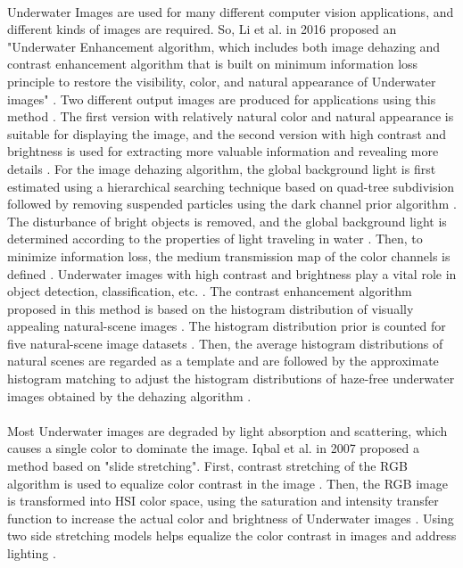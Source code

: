 \documentclass[a4paper,11pt,oneside]{article}
\begin{document}
  \\
   Underwater Images are used for many different computer vision applications, and different kinds of images are required. So, Li et al. in 2016 \cite{21} proposed an "Underwater Enhancement algorithm, which includes both image dehazing and contrast enhancement algorithm that is built on minimum information loss principle to restore the visibility, color, and natural appearance of Underwater images" \cite{21}. Two different output images are produced for applications using this method \cite{21}. The first version with relatively natural color and natural appearance is suitable for displaying the image, and the second version with high contrast and brightness is used for extracting more valuable information and revealing more details \cite{21}. For the image dehazing algorithm, the global background light is first estimated using a hierarchical searching technique based on quad-tree subdivision followed by removing suspended particles using the dark channel prior algorithm \cite{21}. The disturbance of bright objects is removed, and the global background light is determined according to the properties of light traveling in water \cite{21}. Then, to minimize information loss, the medium transmission map of the color channels is defined \cite{21}. Underwater images with high contrast and brightness play a vital role in object detection, classification, etc. \cite{21}. The contrast enhancement algorithm proposed in this method is based on the histogram distribution of visually appealing natural-scene images \cite{21}. The histogram distribution prior is counted for five natural-scene image datasets \cite{21}. Then, the average histogram distributions of natural scenes are regarded as a template and are followed by the approximate histogram matching to adjust the histogram distributions of haze-free underwater images obtained by the dehazing algorithm \cite{21}.\\
  \\
  Most Underwater images are degraded by light absorption and scattering, which causes a single color to dominate the image. Iqbal et al. in 2007 \cite{4} proposed a method based on "slide stretching". First, contrast stretching of the RGB algorithm is used to equalize color contrast in the image \cite{4}. Then, the RGB image is transformed into HSI color space, using the saturation and intensity transfer function to increase the actual color and brightness of Underwater images \cite{4}. Using two side stretching models helps equalize the color contrast in images and address lighting \cite{4}.
 \newpage
\end{document}
